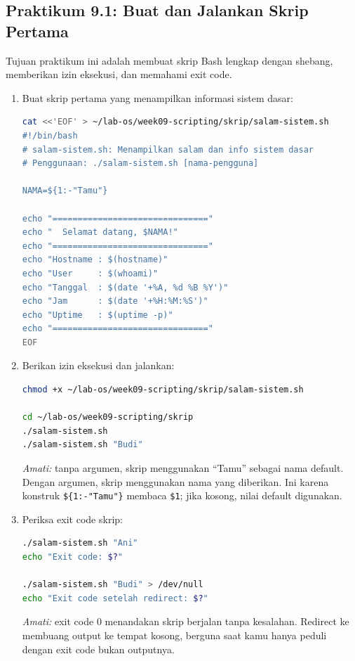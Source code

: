 \subsection*{Praktikum 9.1: Buat dan Jalankan Skrip Pertama}

Tujuan praktikum ini adalah membuat skrip Bash lengkap dengan shebang,
memberikan izin eksekusi, dan memahami exit code.

\begin{enumerate}
    \item Buat skrip pertama yang menampilkan informasi sistem dasar:
\begin{lstlisting}[language=bash, caption={Membuat skrip salam-sistem.sh}]
cat <<'EOF' > ~/lab-os/week09-scripting/skrip/salam-sistem.sh
#!/bin/bash
# salam-sistem.sh: Menampilkan salam dan info sistem dasar
# Penggunaan: ./salam-sistem.sh [nama-pengguna]

NAMA=${1:-"Tamu"}

echo "==============================="
echo "  Selamat datang, $NAMA!"
echo "==============================="
echo "Hostname : $(hostname)"
echo "User     : $(whoami)"
echo "Tanggal  : $(date '+%A, %d %B %Y')"
echo "Jam      : $(date '+%H:%M:%S')"
echo "Uptime   : $(uptime -p)"
echo "==============================="
EOF
\end{lstlisting}

    \item Berikan izin eksekusi dan jalankan:
\begin{lstlisting}[language=bash, caption={Memberikan izin dan menjalankan skrip}]
chmod +x ~/lab-os/week09-scripting/skrip/salam-sistem.sh

cd ~/lab-os/week09-scripting/skrip
./salam-sistem.sh
./salam-sistem.sh "Budi"
\end{lstlisting}
    \textit{Amati:} tanpa argumen, skrip menggunakan ``Tamu'' sebagai
    nama default. Dengan argumen, skrip menggunakan nama yang diberikan.
    Ini karena konstruk \texttt{\$\{1:-"Tamu"\}} membaca \texttt{\$1};
    jika kosong, nilai default digunakan.

    \item Periksa exit code skrip:
\begin{lstlisting}[language=bash, caption={Memeriksa exit code}]
./salam-sistem.sh "Ani"
echo "Exit code: $?"

./salam-sistem.sh "Budi" > /dev/null
echo "Exit code setelah redirect: $?"
\end{lstlisting}
    \textit{Amati:} exit code 0 menandakan skrip berjalan tanpa kesalahan.
    Redirect ke  membuang output ke tempat kosong, berguna
    saat kamu hanya peduli dengan exit code bukan outputnya.


\end{enumerate}
